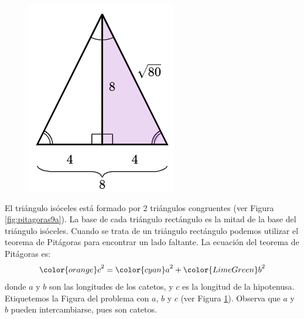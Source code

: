 \begin{solutionbox}{16cm}
\begin{minipage}{0.2\textwidth}
\begin{figure}[H]
            \caption{}
            \label{fig:pitagoras9b}
        \end{figure}
        \begin{figure}[H]
            \centering
            \includegraphics[width=0.9\linewidth]{../images/pitagoras9c.png}
            \caption{}
            \label{fig:pitagoras9c}
        \end{figure}
    \end{minipage}\hfill
    \begin{minipage}{0.75\textwidth}
        El triángulo isóceles está formado por 2 triángulos congruentes (ver Figura \ref{fig:pitagoras9a}).
        La base de cada triángulo rectángulo es la mitad de la base del triángulo isóceles.
        Cuando se trata de un triángulo rectángulo podemos utilizar el teorema de Pitágoras para encontrar un lado faltante.
        La ecuación del teorema de Pitágoras es:
        \[{\color{orange}c}^2={\color{cyan}a}^2+{\color{LimeGreen}b}^2\]
        donde $a$ y $b$ son las longitudes de los catetos, y $c$ es la longitud de la hipotenusa.
        Etiquetemos la Figura del problema con $a$, $b$ y $c$ (ver Figura \ref{fig:pitagoras9b}).
        Observa que $a$ y $b$ pueden intercambiarse, pues son catetos.

\end{minipage}
\end{solutionbox}
